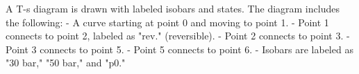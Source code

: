 A T-s diagram is drawn with labeled isobars and states. The diagram includes the following:  
- A curve starting at point 0 and moving to point 1.  
- Point 1 connects to point 2, labeled as "rev." (reversible).  
- Point 2 connects to point 3.  
- Point 3 connects to point 5.  
- Point 5 connects to point 6.  
- Isobars are labeled as "30 bar," "50 bar," and "p0."